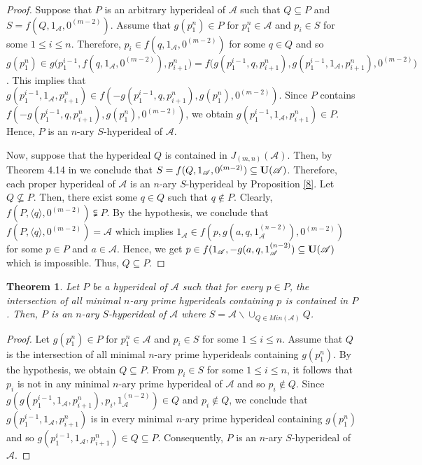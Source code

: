 \documentclass[preprint,review,10pt]{amsart}
\newtheorem{theorem}{Theorem}[section]
\theoremstyle{definition}
\theoremstyle{remark}
\numberwithin{equation}{section}
\begin{document}
\begin{proof}
Suppose that  $P$ is an arbitrary  hyperideal of $\mathscr{A}$ such that $Q \subseteq P$ and $S=f(Q,1_\mathscr{A},0^{(m-2)})$. Assume that $g(p_1^n) \in P$ for $p_1^n \in \mathscr{A}$ and $p_i \in S$ for some $1 \leq i \leq n$. Therefore, $p_i \in f(q,1_\mathscr{A},0^{(m-2)})$ for some $q \in Q$ and so $g(p_1^n) \in g \big(p_1^{i-1},f(q,1_\mathscr{A},0^{(m-2)}), p_{i+1}^n \big)=f \big(g(p_1^{i-1},q,p_{i+1}^n),g(p_1^{i-1},1_\mathscr{A},p_{i+1}^n),0^{(m-2)} \big)$. This implies that $g(p_1^{i-1},1_\mathscr{A},p_{i+1}^n) \in f(-g(p_1^{i-1},q,p_{i+1}^n), g(p_1^n),0^{(m-2)})$. Since $P$ contains $f(-g(p_1^{i-1},q,p_{i+1}^n), g(p_1^n),0^{(m-2)})$, we obtain $g(p_1^{i-1},1_\mathscr{A},p_{i+1}^n) \in P$. Hence,  $P$ is an $n$-ary $S$-hyperideal of $\mathscr{A}$. 

Now, suppose that  the hyperideal $Q$ is contained in $J_{(m,n)}(\mathscr{A})$. Then, by Theorem 4.14 in \cite{sorc1} we conclude that $S =f(Q,1_\mathscr{A},0^{(m-2)})\subseteq {\bf U}(\mathscr{A})$. Therefore, each proper hyperideal of $\mathscr{A}$ is an $n$-ary $S$-hyperideal by Proposition \ref{8}. Let $Q \nsubseteq P$. Then, there exist some $q \in Q$ such that $q \notin P$. Clearly, $f(P,\langle q \rangle,0^{(m-2)}) \subsetneqq  P$. By the hypothesis,  we conclude that  $f(P,\langle q \rangle,0^{(m-2)})=\mathscr{A}$ which implies $1_\mathscr{A} \in f(p,g(a,q,1_\mathscr{A}^{(n-2)}),0^{(m-2)})$ for some $p \in P$ and $a \in \mathscr{A}$. Hence, we get $p \in f(1_\mathscr{A},-g(a,q,1_\mathscr{A}^{(n-2)}) \subseteq {\bf U}(\mathscr{A})$ which is impossible. Thus, $Q \subseteq P$.
\end{proof}
\begin{theorem} \label{12}
Let $P$ be a hyperideal of $\mathscr{A}$ such that for every $p \in P$, the intersection   of all
minimal $n$-ary prime hyperideals containing $p$ is contained in $P$. Then, $P$ is an $n$-ary $S$-hyperideal of $\mathscr{A}$ where $S=\mathscr{A} \backslash \cup_{Q \in Min(\mathscr{A})} Q $.
\end{theorem}
\begin{proof}
Let $g(p_1^n) \in P$ for $p_1^n \in \mathscr{A}$ and $p_i \in S$ for some $1 \leq i \leq n$. Assume that $Q$ is the intersection   of all
minimal $n$-ary prime hyperideals containing $g(p_1^n)$. By the hypothesis, we obtain $Q \subseteq P$.  From $p_i \in S$ for some $1 \leq i \leq n$, it follows that $p_i$ is not in any minimal $n$-ary prime hyperideal of $\mathscr{A}$ and so $p_i \notin Q$. Since $g(g(p_1^{i-1},1_\mathscr{A},p_{i+1}^n),p_i,1_ \mathscr{A}^{(n-2)}) \in Q$  and $p_i \notin Q$, we conclude that $g(p_1^{i-1},1_\mathscr{A},p_{i+1}^n)$ is in every minimal $n$-ary prime hyperideal containing $g(p_1^n)$ and so $g(p_1^{i-1},1_\mathscr{A},p_{i+1}^n) \in Q \subseteq P$. Consequently, $P$ is an $n$-ary $S$-hyperideal of $\mathscr{A}$.
\end{proof}
\end{document}
